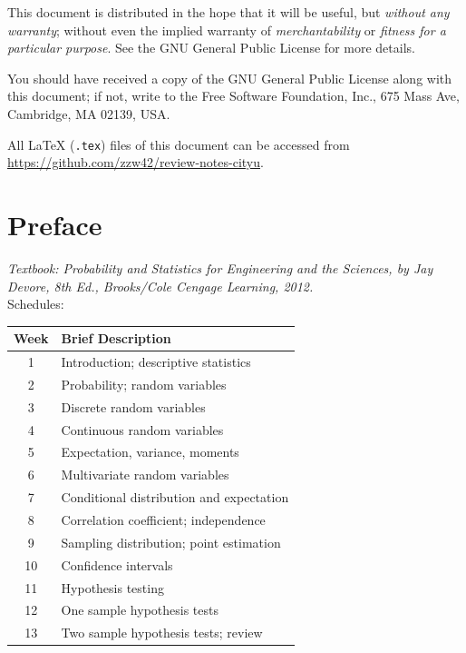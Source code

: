 \documentclass[UTF8,a4paper,openany]{book}
\theoremstyle{plain}					%
\theoremstyle{definition}
\begin{document}
This document is distributed in the hope that it will be useful, but \emph{without any 
warranty}; without even the implied warranty of \emph{merchantability} or \emph{fitness 
for a particular purpose}. See the GNU General Public License for more details.

You should have received a copy of the GNU General Public License along with this document; 
if not, write to the Free Software Foundation, Inc., 675 Mass Ave, Cambridge, MA 02139, USA.

All \LaTeX{} (\texttt{.tex}) files of this document can be accessed from
\url{https://github.com/zzw42/review-notes-cityu}.

\chapter*{Preface}
\textsl{
Textbook: Probability and Statistics for Engineering and the Sciences, by Jay Devore, 8th Ed., Brooks/Cole Cengage Learning, 2012. }
\\

Schedules:

\begin{center}
\begin{tabular}{cl}
\hline\hline
Week & Brief Description \\
\hline
1 & Introduction; descriptive statistics \\
2 & Probability; random variables \\
3 & Discrete random variables \\
4 & Continuous random variables \\
5 & Expectation, variance, moments \\
6 & Multivariate random variables \\
7 & Conditional distribution and expectation \\
8 & Correlation coefficient; independence \\
9 & Sampling distribution; point estimation \\
10 & Confidence intervals  \\
11 & Hypothesis testing \\
12 & One sample hypothesis tests \\
13 & Two sample hypothesis tests; review \\
\hline\hline
\end{tabular}
\end{center}


\tableofcontents
\listoffigures


\mainmatter










\end{document}
